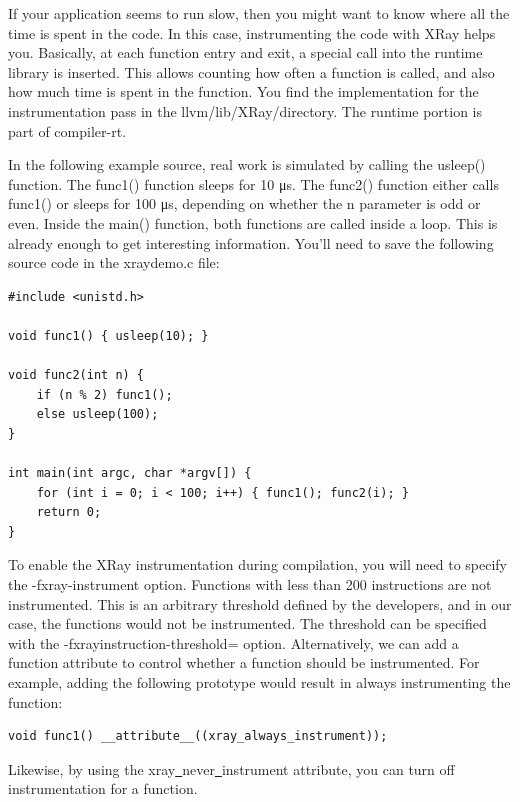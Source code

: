 
If your application seems to run slow, then you might want to know where all the time is spent in the code. In this case, instrumenting the code with XRay helps you. Basically, at each function entry and exit, a special call into the runtime library is inserted. This allows counting how often a function is called, and also how much time is spent in the function. You find the implementation for the instrumentation pass in the llvm/lib/XRay/directory. The runtime portion is part of compiler-rt.\par

In the following example source, real work is simulated by calling the usleep() function. The func1() function sleeps for 10 μs. The func2() function either calls func1() or sleeps for 100 μs, depending on whether the n parameter is odd or even. Inside the main() function, both functions are called inside a loop. This is already enough to get interesting information. You'll need to save the following source code in the xraydemo.c file:\par

\begin{lstlisting}[caption={}]
#include <unistd.h>

void func1() { usleep(10); }

void func2(int n) {
	if (n % 2) func1();
	else usleep(100);
}

int main(int argc, char *argv[]) {
	for (int i = 0; i < 100; i++) { func1(); func2(i); }
	return 0;
}
\end{lstlisting}

To enable the XRay instrumentation during compilation, you will need to specify the -fxray-instrument option. Functions with less than 200 instructions are not instrumented. This is an arbitrary threshold defined by the developers, and in our case, the functions would not be instrumented. The threshold can be specified with the -fxrayinstruction-threshold= option. Alternatively, we can add a function attribute to control whether a function should be instrumented. For example, adding the following prototype would result in always instrumenting the function:\par

\begin{lstlisting}[caption={}]
void func1() __attribute__((xray_always_instrument));
\end{lstlisting}

Likewise, by using the xray\underline{~}never\underline{~}instrument attribute, you can turn off
instrumentation for a function.\par

